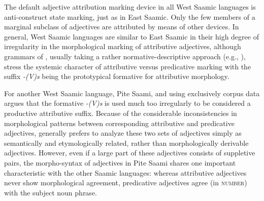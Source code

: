 The default adjective attribution marking device in all West Saamic languages is anti\hyp{}construct state marking, just as in East Saamic. Only the few members of a marginal subclass of adjectives are attributed by means of other devices. In general, West Saamic languages are similar to East Saamic in their high degree of irregularity in the morphological marking of attributive adjectives, although grammars of , usually taking a rather normative-descriptive approach (e.g., \citealt{nickel1990,sammallahti1998b,svonni2009a}), stress the systemic character of attributive versus predicative marking with the suffix \textit{-(V)s} being the prototypical  formative for attributive morphology.

For another West Saamic language, Pite Saami, and using exclusively corpus data \citet[128–129]{wilbur2014a} argues that the formative \textit{-(V)s} is used much too irregularly to be considered a productive attributive suffix. Because of the considerable inconsistencies in morphological patterns between corresponding attributive and predicative adjectives, \cite[134]{wilbur2014a} generally prefers to analyze these two sets of adjectives simply as semantically and etymologically related, rather than morphologically derivable adjectives. However, even if a large part of these adjectives consists of suppletive pairs, the morpho-syntax of adjectives in Pite Saami shares one important characteristic with the other Saamic languages: whereas attributive adjectives never show morphological agreement, predicative adjectives agree (in \textsc{number}) with the subject noun phrase.

